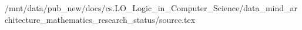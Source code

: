 /mnt/data/pub_new/docs/cs.LO_Logic_in_Computer_Science/data_mind_architecture_mathematics_research_status/source.tex